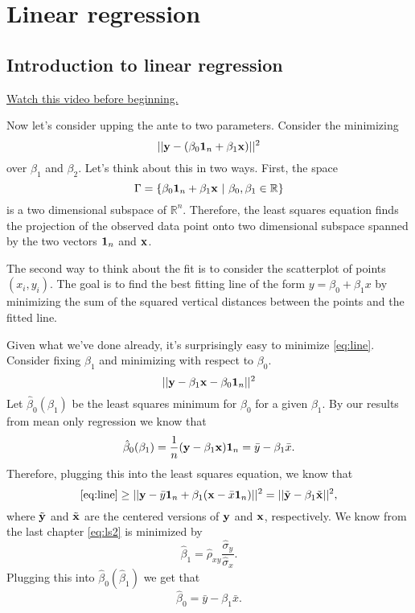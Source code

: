 \chapter{Linear regression}

\section{Introduction to linear regression}
\href{https://www.youtube.com/watch?v=0PLufpySIcs&list=PLpl-gQkQivXhdgUCdaUQcdb31CRe8Mm2y&index=14}{Watch this video before beginning.}

Now let's consider upping the ante to two parameters. Consider the minimizing
\begin{equation}
\label{eq:line}
|| \mathbf{y} - (\beta_0 \mathbf{1}_n + \beta_1 \mathbf{x}) ||^2
\end{equation}
over $\beta_1$ and $\beta_2$. Let's think about this in two ways. 
First, the space $$\Gamma = \{\beta_0 \mathbf{1}_n + \beta_1 \mathbf{x} ~|~ \beta_0, \beta_1 \in \mathbb{R}\}$$
is a two dimensional subspace of $\mathbb{R}^n$. Therefore, the least squares
equation finds the projection of the observed data point 
onto two dimensional subspace spanned by the two vectors $\mathbf{1}_n$ and $\mathbf{x}$.

The second way to think about the fit is to consider the scatterplot
of points $(x_i, y_i)$. The goal is to find the best fitting line
of the form $y = \beta_0 + \beta_1 x$ by minimizing the sum of the
squared vertical distances between the points and the fitted line. 

Given what we've done already, it's surprisingly easy to minimize
\eqref{eq:line}. Consider fixing $\beta_1$ and minimizing
with respect to $\beta_0$.
$$
|| \mathbf{y} - \beta_1 \mathbf{x}  - \beta_0 \mathbf{1}_n ||^2
$$
Let $\hat \beta_0 (\beta_1)$ be the least squares minimum for $\beta_0$
for a given $\beta_1$. 
By our results from mean only regression we know that
\begin{equation*}
\label{eq:intercept}
\hat \beta_0 (\beta_1) = \frac{1}{n}(\mathbf{y} - \beta_1 \mathbf{x}) \mathbf{1}_n = \bar y - \beta_1 \bar x.
\end{equation*}
Therefore, plugging this into the least squares equation, we know that
\begin{equation}
\label{eq:ls2}
\eqref{eq:line} \geq 
|| \mathbf{y} -  \bar y \mathbf{1}_n + \beta_1 (\mathbf{x}  - \bar x \mathbf{1}_n) ||^2= || \tilde {\mathbf{y}} - \beta_1 \tilde {\mathbf{x}}||^2,
\end{equation}
where $\tilde {\mathbf{y}}$ and $\tilde {\mathbf{x}}$ are the centered versions of $\mathbf{y}$ and
$\mathbf{x}$, respectively. We know from the last chapter \eqref{eq:ls2} is minimized 
by 
$$\hat \beta_1 = \hat \rho_{xy} \frac{\hat \sigma_y}{\hat \sigma_x}.$$
Plugging this into $\hat \beta_0(\hat \beta_1)$ we get that
$$
\hat \beta_0 = \bar y - \beta_1 \bar x.
$$

